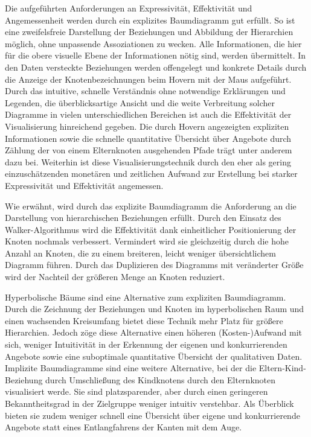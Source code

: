 \documentclass[usegeometry=true]{scrartcl}
\begin{document}
Die aufgeführten Anforderungen an Expressivität, Effektivität und Angemessenheit werden durch ein explizites Baumdiagramm gut erfüllt.
So ist eine zweifelsfreie Darstellung der Beziehungen und Abbildung der Hierarchien möglich, ohne unpassende Assoziationen zu wecken. 
Alle Informationen, die hier für die obere visuelle Ebene der Informationen nötig sind, werden übermittelt. 
In den Daten versteckte Beziehungen werden offengelegt und konkrete Details durch die Anzeige der Knotenbezeichnungen beim Hovern mit der Maus aufgeführt.
Durch das intuitive, schnelle Verständnis ohne notwendige Erklärungen und Legenden, die überblicksartige Ansicht und die weite Verbreitung solcher Diagramme in vielen unterschiedlichen Bereichen ist auch die Effektivität der Visualisierung hinreichend gegeben. 
Die durch Hovern angezeigten expliziten Informationen sowie die schnelle quantitative Übersicht über Angebote durch Zählung der von einem Elternknoten ausgehenden Pfade trägt unter anderem dazu bei.
Weiterhin ist diese Visualisierungstechnik durch den eher als gering einzuschätzenden monetären und zeitlichen Aufwand zur Erstellung bei starker Expressivität und Effektivität angemessen.

Wie erwähnt, wird durch das explizite Baumdiagramm die Anforderung an die Darstellung von hierarchischen Beziehungen erfüllt.
Durch den Einsatz des Walker-Algorithmus wird die Effektivität dank einheitlicher Positionierung der Knoten nochmals verbessert.\cite[688ff.]{Walker.1990}
Vermindert wird sie gleichzeitig durch die hohe Anzahl an Knoten, die zu einem breiteren, leicht weniger übersichtlichem Diagramm führen. 
Durch das Duplizieren des Diagramms mit veränderter Größe wird der Nachteil der größeren Menge an Knoten reduziert.

Hyperbolische Bäume sind eine Alternative zum expliziten Baumdiagramm. 
Durch die Zeichnung der Beziehungen und Knoten im hyperbolischen Raum und einen wachsenden Kreisumfang bietet diese Technik mehr Platz für größere Hierarchien.\cite[2f.]{Lamping.1995}
Jedoch zöge diese Alternative einen höheren (Kosten-)Aufwand mit sich, weniger Intuitivität in der Erkennung der eigenen und konkurrierenden Angebote sowie eine suboptimale quantitative Übersicht der qualitativen Daten. 
Implizite Baumdiagramme sind eine weitere Alternative, bei der die Eltern-Kind-Beziehung durch Umschließung des Kindknotens durch den Elternknoten visualisiert werde.\cite[394]{Schulz.2011}
Sie sind platzsparender, aber durch einen geringeren Bekanntheitsgrad in der Zielgruppe weniger intuitiv verstehbar. 
Als Überblick bieten sie zudem weniger schnell eine Übersicht über eigene und konkurrierende Angebote statt eines Entlangfahrens der Kanten mit dem Auge.
\end{document}
